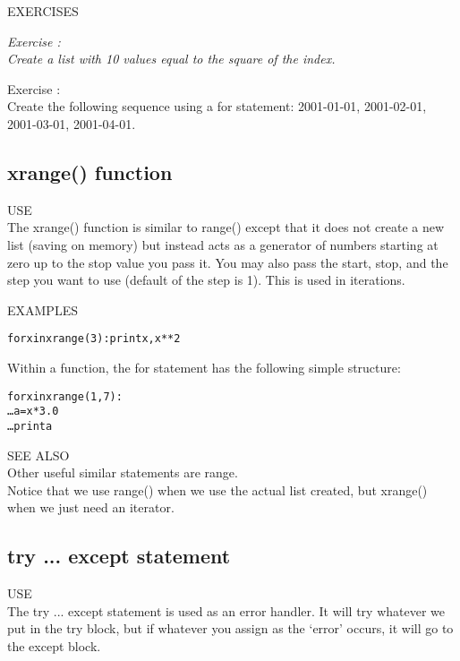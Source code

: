 {\color{blue} {\sf\small EXERCISES}} \\
{\it Exercise  :  \\
Create a list with 10 values equal to the square of the index.

Exercise  :  \\
Create the following sequence using a {\sf\small for} statement:
2001-01-01, 2001-02-01, 2001-03-01, 2001-04-01.}



\subsection{ {\sf xrange() } function}
{\color{blue} {\sf\small USE}} \\

The {\sf\small xrange()} function is similar to {\sf \small range()}
except that it does not create a new list (saving on memory) but
instead acts as a generator of numbers starting at zero up to the stop
value you pass it.  You may also pass the start, stop, and the step
you want to use (default of the step is 1).  This is used in iterations.

{\color{blue} {\sf\small EXAMPLES}} 
\begin{alltt}
\pytab for x in xrange(3): print x, x ** 2
\end{alltt}
Within a function, the {\sf\small for }  statement has the following
simple structure: 
\begin{alltt}
\pytab for x in xrange(1, 7): 
\ldots    a = x * 3.0
\ldots    print a 
\end{alltt}
  
{\color{blue} {\sf\small SEE ALSO}} \\
Other useful similar statements are {\sf\small range}.  \\

Notice that we use {\sf \small range()} when we use the actual list
created, but {\sf \small xrange()} when we just need an iterator.  

\subsection{ {\sf try ... except } statement}
{\color{blue} {\sf\small USE}} \\
The {\sf\small try ... except} statement is used as an error
handler.  It will try whatever we put in the {\sf\small try} block,
but if whatever you assign as the `error' occurs, it will go to the
{\sf\small except} block.

